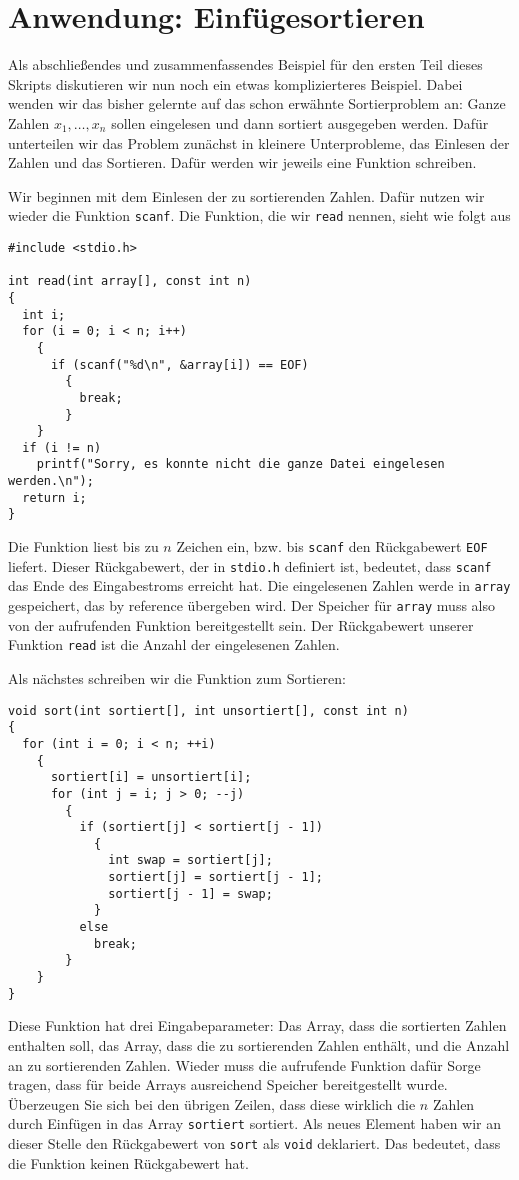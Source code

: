 \section{Anwendung: Einfügesortieren}

Als abschließendes und zusammenfassendes Beispiel für den ersten Teil dieses Skripts diskutieren wir nun noch ein etwas komplizierteres Beispiel.
Dabei wenden wir das bisher gelernte auf das schon erwähnte Sortierproblem an:
Ganze Zahlen $x_1, \ldots, x_n$ sollen eingelesen und dann sortiert ausgegeben werden.
Dafür unterteilen wir das Problem zunächst in kleinere Unterprobleme, das Einlesen der Zahlen und das Sortieren.
Dafür werden wir jeweils eine Funktion schreiben.

Wir beginnen mit dem Einlesen der zu sortierenden Zahlen.
Dafür nutzen wir wieder die Funktion \verb|scanf|.
Die Funktion, die wir \verb|read| nennen, sieht wie folgt aus
\begin{lstlisting}
#include <stdio.h>

int read(int array[], const int n)
{
  int i;
  for (i = 0; i < n; i++)
    {
      if (scanf("%d\n", &array[i]) == EOF)
        {
          break;
        }
    }
  if (i != n)
    printf("Sorry, es konnte nicht die ganze Datei eingelesen werden.\n");
  return i;
}
\end{lstlisting}
Die Funktion liest bis zu $n$ Zeichen ein, bzw. bis \verb|scanf| den Rückgabewert \verb|EOF| liefert.
Dieser Rückgabewert, der in \verb|stdio.h| definiert ist, bedeutet, dass \verb|scanf| das Ende des Eingabestroms erreicht hat.
Die eingelesenen Zahlen werde in \verb|array| gespeichert, das by reference übergeben wird.
Der Speicher für \verb|array| muss also von der aufrufenden Funktion bereitgestellt sein.
Der Rückgabewert unserer Funktion \verb|read| ist die Anzahl der eingelesenen Zahlen.

Als nächstes schreiben wir die Funktion zum Sortieren:
\begin{lstlisting}
void sort(int sortiert[], int unsortiert[], const int n)
{
  for (int i = 0; i < n; ++i)
    {
      sortiert[i] = unsortiert[i];
      for (int j = i; j > 0; --j)
        {
          if (sortiert[j] < sortiert[j - 1])
            {
              int swap = sortiert[j];
              sortiert[j] = sortiert[j - 1];
              sortiert[j - 1] = swap;
            }
          else
            break;
        }
    }
}
\end{lstlisting}
Diese Funktion hat drei Eingabeparameter: Das Array, dass die sortierten Zahlen enthalten soll, das Array, dass die zu sortierenden Zahlen enthält, und die Anzahl an zu sortierenden Zahlen.
Wieder muss die aufrufende Funktion dafür Sorge tragen, dass für beide Arrays ausreichend Speicher bereitgestellt wurde.
Überzeugen Sie sich bei den übrigen Zeilen, dass diese wirklich die $n$ Zahlen durch Einfügen in das Array \verb|sortiert| sortiert.
Als neues Element haben wir an dieser Stelle den Rückgabewert von \verb|sort| als \verb|void| deklariert.
Das bedeutet, dass die Funktion keinen Rückgabewert hat.

